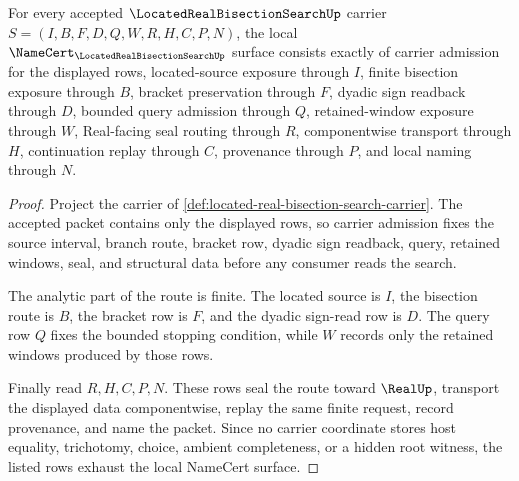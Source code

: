 \begin{theorem}
\label{thm:located-real-bisection-search-namecert-obligations}
For every accepted $\LocatedRealBisectionSearchUp$ carrier $S=(I,B,F,D,Q,W,R,H,C,P,N)$, the local $\NameCert_{\LocatedRealBisectionSearchUp}$ surface consists exactly of carrier admission for the displayed rows, located-source exposure through $I$, finite bisection exposure through $B$, bracket preservation through $F$, dyadic sign readback through $D$, bounded query admission through $Q$, retained-window exposure through $W$, Real-facing seal routing through $R$, componentwise transport through $H$, continuation replay through $C$, provenance through $P$, and local naming through $N$.
\end{theorem}
\begin{proof}
Project the carrier of \autoref{def:located-real-bisection-search-carrier}. The accepted packet contains only the displayed rows, so carrier admission fixes the source interval, branch route, bracket row, dyadic sign readback, query, retained windows, seal, and structural data before any consumer reads the search.

The analytic part of the route is finite. The located source is $I$, the bisection route is $B$, the bracket row is $F$, and the dyadic sign-read row is $D$. The query row $Q$ fixes the bounded stopping condition, while $W$ records only the retained windows produced by those rows.

Finally read $R,H,C,P,N$. These rows seal the route toward $\RealUp$, transport the displayed data componentwise, replay the same finite request, record provenance, and name the packet. Since no carrier coordinate stores host equality, trichotomy, choice, ambient completeness, or a hidden root witness, the listed rows exhaust the local NameCert surface.
\end{proof}

